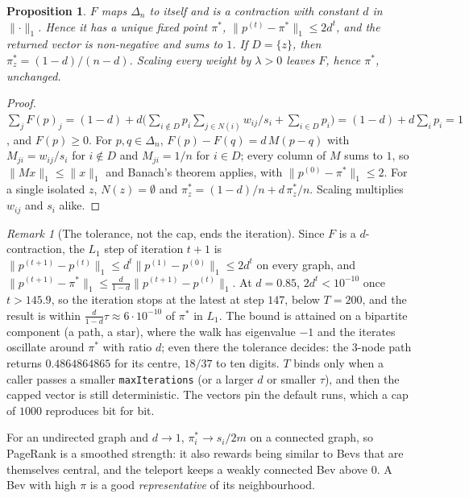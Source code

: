\documentclass[11pt]{article}
\newcommand{\code}[1]{\texttt{#1}}
\theoremstyle{plain}
\newtheorem{proposition}[theorem]{Proposition}
\theoremstyle{definition}
\theoremstyle{remark}
\newtheorem{remark}[theorem]{Remark}
\begin{document}
\begin{proposition}\label{prop:pagerank}
$F$ maps $\Delta_n$ to itself and is a contraction with constant $d$ in $\lVert\cdot\rVert_1$. Hence it has a unique fixed point $\pi^\ast$, $\lVert p^{(t)} - \pi^\ast \rVert_1 \le 2 d^t$, and the returned vector is non-negative and sums to $1$. If $D = \{z\}$, then $\pi^\ast_z = (1 - d)/(n - d)$. Scaling every weight by $\lambda > 0$ leaves $F$, hence $\pi^\ast$, unchanged.
\end{proposition}
\begin{proof}
$\sum_j F(p)_j = (1 - d) + d\bigl(\sum_{i \notin D} p_i \sum_{j \in N(i)} w_{ij}/s_i + \sum_{i \in D} p_i\bigr) = (1 - d) + d \sum_i p_i = 1$, and $F(p) \ge 0$. For $p, q \in \Delta_n$, $F(p) - F(q) = d\, M (p - q)$ with $M_{ji} = w_{ij}/s_i$ for $i \notin D$ and $M_{ji} = 1/n$ for $i \in D$; every column of $M$ sums to $1$, so $\lVert M x \rVert_1 \le \lVert x \rVert_1$ and Banach's theorem applies, with $\lVert p^{(0)} - \pi^\ast \rVert_1 \le 2$. For a single isolated $z$, $N(z) = \emptyset$ and $\pi^\ast_z = (1 - d)/n + d\, \pi^\ast_z / n$. Scaling multiplies $w_{ij}$ and $s_i$ alike.
\end{proof}

\begin{remark}[The tolerance, not the cap, ends the iteration]\label{rem:pagerankcap}
Since $F$ is a $d$-contraction, the $L_1$ step of iteration $t + 1$ is $\lVert p^{(t+1)} - p^{(t)} \rVert_1 \le d^t \lVert p^{(1)} - p^{(0)} \rVert_1 \le 2 d^t$ on every graph, and $\lVert p^{(t+1)} - \pi^\ast \rVert_1 \le \frac{d}{1-d} \lVert p^{(t+1)} - p^{(t)} \rVert_1$. At $d = 0.85$, $2 d^t < 10^{-10}$ once $t > 145.9$, so the iteration stops at the latest at step $147$, below $T = 200$, and the result is within $\frac{d}{1-d}\tau \approx 6 \cdot 10^{-10}$ of $\pi^\ast$ in $L_1$. The bound is attained on a bipartite component (a path, a star), where the walk has eigenvalue $-1$ and the iterates oscillate around $\pi^\ast$ with ratio $d$; even there the tolerance decides: the $3$-node path returns $0.4864864865$ for its centre, $18/37$ to ten digits. $T$ binds only when a caller passes a smaller \code{maxIterations} (or a larger $d$ or smaller $\tau$), and then the capped vector is still deterministic. The vectors pin the default runs, which a cap of $1000$ reproduces bit for bit.
\end{remark}

For an undirected graph and $d \to 1$, $\pi^\ast_i \to s_i / 2m$ on a connected graph, so PageRank is a smoothed strength: it also rewards being similar to Bevs that are themselves central, and the teleport keeps a weakly connected Bev above $0$. A Bev with high $\pi$ is a good \emph{representative} of its neighbourhood.
\end{document}

